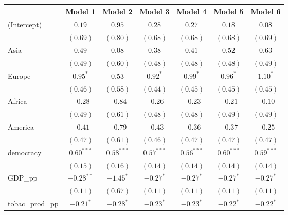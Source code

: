 
\begin{table}[!h]
\begin{center}
\begin{tabular}{l c c c c c c }
\toprule
 & Model 1 & Model 2 & Model 3 & Model 4 & Model 5 & Model 6 \\
\midrule
(Intercept)             & $0.19$       & $0.95$       & $0.28$       & $0.27$       & $0.18$       & $0.08$       \\
                        & $(0.69)$     & $(0.80)$     & $(0.68)$     & $(0.68)$     & $(0.68)$     & $(0.69)$     \\
Asia                    & $0.49$       & $0.08$       & $0.38$       & $0.41$       & $0.52$       & $0.63$       \\
                        & $(0.49)$     & $(0.60)$     & $(0.48)$     & $(0.48)$     & $(0.48)$     & $(0.49)$     \\
Europe                  & $0.95^{*}$   & $0.53$       & $0.92^{*}$   & $0.99^{*}$   & $0.96^{*}$   & $1.10^{*}$   \\
                        & $(0.46)$     & $(0.58)$     & $(0.44)$     & $(0.45)$     & $(0.45)$     & $(0.45)$     \\
Africa                  & $-0.28$      & $-0.84$      & $-0.26$      & $-0.23$      & $-0.21$      & $-0.10$      \\
                        & $(0.49)$     & $(0.61)$     & $(0.48)$     & $(0.48)$     & $(0.49)$     & $(0.49)$     \\
America                 & $-0.41$      & $-0.79$      & $-0.43$      & $-0.36$      & $-0.37$      & $-0.25$      \\
                        & $(0.47)$     & $(0.61)$     & $(0.46)$     & $(0.47)$     & $(0.47)$     & $(0.47)$     \\
democracy               & $0.60^{***}$ & $0.58^{***}$ & $0.57^{***}$ & $0.56^{***}$ & $0.60^{***}$ & $0.59^{***}$ \\
                        & $(0.15)$     & $(0.16)$     & $(0.14)$     & $(0.14)$     & $(0.14)$     & $(0.14)$     \\
GDP\_pp                 & $-0.28^{**}$ & $-1.45^{*}$  & $-0.27^{*}$  & $-0.27^{*}$  & $-0.27^{*}$  & $-0.27^{*}$  \\
                        & $(0.11)$     & $(0.67)$     & $(0.11)$     & $(0.11)$     & $(0.11)$     & $(0.11)$     \\
tobac\_prod\_pp         & $-0.21^{*}$  & $-0.28^{*}$  & $-0.23^{*}$  & $-0.23^{*}$  & $-0.22^{*}$  & $-0.22^{*}$  \\

\end{tabular}
\end{center}
\end{table}
